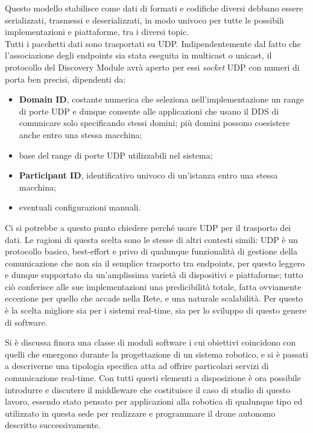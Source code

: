 \indent Questo modello stabilisce come dati di formati e codifiche diversi debbano essere serializzati, trasmessi e deserializzati, in modo univoco per tutte le possibili implementazioni e piattaforme, tra i diversi topic.\\
Tutti i pacchetti dati sono trasportati su UDP. Indipendentemente dal fatto che l’associazione degli endpoints sia stata eseguita in multicast o unicast, il protocollo del Discovery Module avrà aperto per essi \emph{socket} UDP con numeri di porta ben precisi, dipendenti da:
\begin{itemize}
    \item \textbf{Domain ID}, costante numerica che seleziona nell'implementazione un range di porte UDP e dunque consente alle applicazioni che usano il DDS di comunicare solo specificando stessi domini; più domini possono coesistere anche entro una stessa macchina;
    \item base del range di porte UDP utilizzabili nel sistema;
    \item \textbf{Participant ID}, identificativo univoco di un'istanza entro una stessa macchina;
    \item eventuali configurazioni manuali.
\end{itemize}
Ci si potrebbe a questo punto chiedere perché usare UDP per il trasporto dei dati. Le ragioni di questa scelta sono le stesse di altri contesti simili: UDP è un protocollo basico, best-effort e privo di qualunque funzionalità di gestione della comunicazione che non sia il semplice trasporto tra endpoints, per questo leggero e dunque supportato da un'amplissima varietà di dispositivi e piattaforme; tutto ciò conferisce alle sue implementazioni una predicibilità totale, fatta ovviamente eccezione per quello che accade nella Rete, e una naturale scalabilità. Per questo è la scelta migliore sia per i sistemi real-time, sia per lo sviluppo di questo genere di software.\newpage

\indent Si è discussa finora una classe di moduli software i cui obiettivi coincidono con quelli che emergono durante la progettazione di un sistema robotico, e si è passati a descriverne una tipologia specifica atta ad offrire particolari servizi di comunicazione real-time. Con tutti questi elementi a disposizione è ora possibile introdurre e discutere il middleware che costituisce il caso di studio di questo lavoro, essendo stato pensato per applicazioni alla robotica di qualunque tipo ed utilizzato in questa sede per realizzare e programmare il drone autonomo descritto successivamente.
